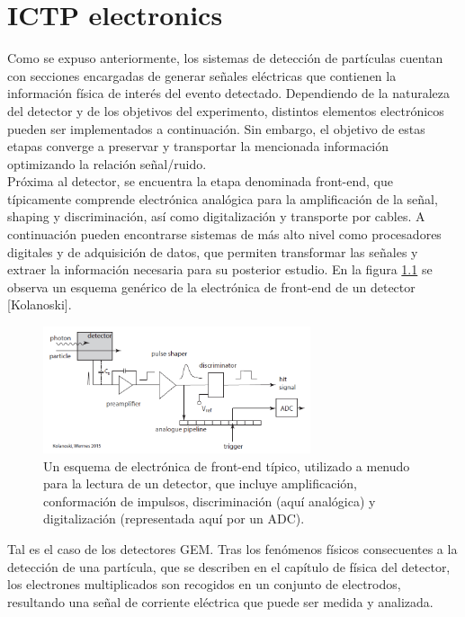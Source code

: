 \documentclass[]{book}
\begin{document}
\chapter{ICTP electronics}

\noindent Como se expuso anteriormente, los sistemas de detección de partículas cuentan con secciones encargadas de generar señales eléctricas que contienen la información física de interés del evento detectado. Dependiendo de la naturaleza del detector y de los objetivos del experimento, distintos elementos electrónicos pueden ser implementados a continuación. Sin embargo, el objetivo de estas etapas converge a preservar y transportar la mencionada información optimizando la relación señal/ruido. \\

\noindent Próxima al detector, se encuentra la etapa denominada front-end, que típicamente comprende electrónica analógica para la amplificación de la señal, shaping y discriminación, así como digitalización y transporte por cables. A continuación pueden encontrarse sistemas de más alto nivel como procesadores digitales y de adquisición de datos, que permiten transformar las señales y extraer la información necesaria para su posterior estudio. En la figura \ref{fig:generic_frontend} se observa un esquema genérico de la electrónica de front-end de un detector [Kolanoski].

\begin{figure}[h]
    \centering
    \includegraphics[width=0.7\textwidth]{typical_readout_electronics.PNG}
    \caption{Un esquema de electrónica de front-end típico, utilizado a menudo para la lectura de un
    detector, que incluye amplificación, conformación de impulsos, discriminación
    (aquí analógica) y digitalización (representada aquí por un ADC).}
    \label{fig:generic_frontend}

\end{figure}
    
\noindent Tal es el caso de los detectores GEM. Tras los fenómenos físicos consecuentes a la detección de una partícula, que se describen en el capítulo de física del detector, los electrones multiplicados son recogidos en un conjunto de electrodos, resultando una señal de corriente eléctrica que puede ser medida y analizada.\\
\end{document}
